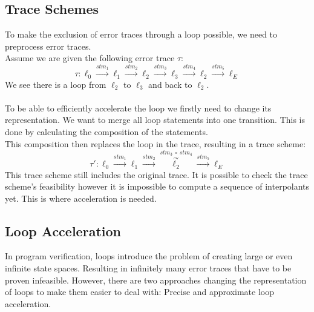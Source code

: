 \documentclass{article}
\begin{document}
\subsection{Trace Schemes}
To make the exclusion of error traces through a loop possible, we need to preprocess error traces. \\
Assume we are given the following error trace $\tau$:
\begin{equation*}
\tau: \ell_0 \xrightarrow{\text{$stm_1$}} \ell_1 \xrightarrow{\text{$stm_2$}} \ell_2 \xrightarrow{\text{$stm_3$}} \ell_3 \xrightarrow{\text{$stm_4$}} \ell_2 \xrightarrow{\text{$stm_5$}} \ell_E
\end{equation*}
We see there is a loop from $\ell_2$ to $\ell_3$ and back to $\ell_2$.  \\ \\
To be able to efficiently accelerate the loop we firstly need to change its representation. We want to merge all loop statements into one transition. This is done by calculating the composition of the statements. \\
This composition then replaces the loop in the trace, resulting in a trace scheme:
\begin{equation*}
\tau':\ell_0 \xrightarrow{\text{$stm_1$}} \ell_1 \xrightarrow{\text{$stm_2$}} \overset{stm_3\ \circ \ stm_4}{\overset{\curvearrowright}{\ell_2}} \xrightarrow{\text{$stm_5$}} \ell_E
\end{equation*}
This trace scheme still includes the original trace. It is possible to check the trace scheme's feasibility however it is impossible to compute a sequence of interpolants yet. This is where acceleration is needed.

\subsection{Loop Acceleration}
In program verification, loops introduce the problem of creating large or even infinite state spaces. Resulting in infinitely many error traces that have to be proven infeasible. However, there are two approaches changing the representation of loops to make them easier to deal with: Precise and approximate loop acceleration.
\end{document}
